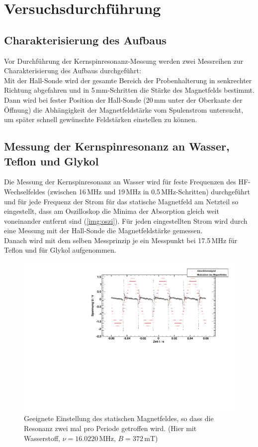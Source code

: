 \section{Versuchsdurchführung}




\subsection*{Charakterisierung des Aufbaus}
Vor Durchführung der Kernspinresonanz-Messung werden
zwei Messreihen zur Charakterisierung des Aufbaus durchgeführt:\\
Mit der Hall-Sonde wird der gesamte Bereich der Probenhalterung in senkrechter
Richtung abgefahren und in 5\,mm-Schritten die Stärke des Magnetfelds bestimmt.\\
Dann wird bei fester Position der Hall-Sonde (20\,mm unter der Oberkante der Öffnung) die Abhängigkeit
der Magnetfeldstärke vom Spulenstrom untersucht,
um später schnell gewünschte Feldstärken einstellen zu können.

\subsection*{Messung der Kernspinresonanz an Wasser, Teflon und Glykol}
Die Messung der Kernspinresonanz an Wasser wird für feste Frequenzen des HF-Wech\-sel\-fel\-des
(zwischen 16\,MHz und 19\,MHz in 0.5\,MHz-Schritten)
durchgeführt und für jede Frequenz der Strom für das statische Magnetfeld am Netzteil so eingestellt,
dass am Oszilloskop die Minima der Absorption gleich weit voneinander entfernt sind (\autoref{img:oszi}).
Für jeden eingestellten Strom wird durch eine Messung mit der Hall-Sonde die Magnetfeldstärke gemessen.\\
Danach wird mit dem selben Messprinzip je ein Messpunkt bei 17.5\,MHz für Teflon und für Glykol aufgenommen.

\begin{figure}[H]
\begin{center}
  \includegraphics[width=\textwidth]{../img/graph_02.pdf}
  \caption{Geeignete Einstellung des statischen Magnetfeldes, so dass die Resonanz zwei mal pro Periode getroffen wird. 
  (Hier mit Wasserstoff, $\nu=16.0220$\,MHz, $B=372$\,mT)}
  \label{img:oszi}
\end{center}
\end{figure}
